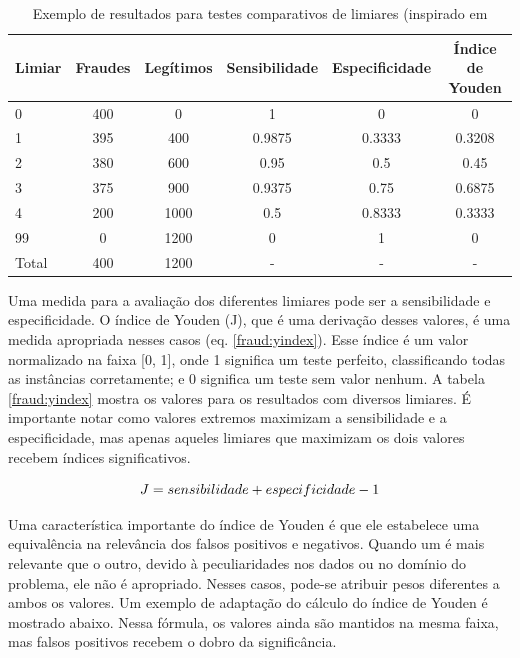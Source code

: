 \begin{table}[h!]
    \vspace{2mm}
    \caption{Exemplo de resultados para testes comparativos de limiares (inspirado em \citet{Bewick2004}}
    \centering
    \begin{tabular}{l c c c c c}
        \hline
        Limiar & Fraudes & Legítimos & Sensibilidade & Especificidade & Índice de Youden \\
        \hline
        0     & 400 &    0 & 1      & 0      & 0      \\
        1     & 395 &  400 & 0.9875 & 0.3333 & 0.3208  \\
        2     & 380 &  600 & 0.95   & 0.5    & 0.45   \\
        3     & 375 &  900 & 0.9375 & 0.75   & 0.6875 \\
        4     & 200 & 1000 & 0.5    & 0.8333 & 0.3333 \\
        99    &   0 & 1200 & 0      & 1      & 0      \\
        \hline
        Total & 400 & 1200 &    -   &    -   &    -   \\
        \hline
    \end{tabular}
    \label{fraud:youden}
    \vspace{2mm}
\end{table}

Uma medida para a avaliação dos diferentes limiares pode ser a sensibilidade e especificidade. O índice de Youden (J), que é uma derivação desses valores, é uma medida apropriada nesses casos (eq. \ref{fraud:yindex}). Esse índice é um valor normalizado na faixa [0, 1], onde 1 significa um teste perfeito, classificando todas as instâncias corretamente; e 0 significa um teste sem valor nenhum. A tabela \ref{fraud:yindex} mostra os valores para os resultados com diversos limiares. É importante notar como valores extremos maximizam a sensibilidade e a especificidade, mas apenas aqueles limiares que maximizam os dois valores recebem índices significativos.

\begin{equation}
    \vspace{2mm}
    J = sensibilidade + especificidade - 1
    \label{fraud:yindex}
    \vspace{2mm}
\end{equation}

Uma característica importante do índice de Youden é que ele estabelece uma equivalência na relevância dos falsos positivos e negativos. Quando um é mais relevante que o outro, devido à peculiaridades nos dados ou no domínio do problema, ele não é apropriado. Nesses casos, pode-se atribuir pesos diferentes a ambos os valores. Um exemplo de adaptação do cálculo do índice de Youden é mostrado abaixo. Nessa fórmula, os valores ainda são mantidos na mesma faixa, mas falsos positivos recebem o dobro da significância.

